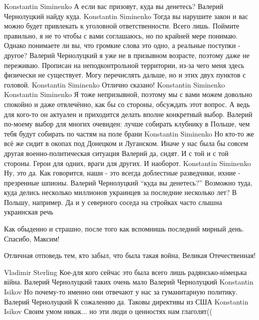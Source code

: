\begin{itemize}
\begin{itemize}
Konstantin Siminenko А если вас призовут, куда вы денетесь?
Валерий Чернолуцкий найду куда.
Konstantin Siminenko Тогда вы нарушите закон и вас можно будет привлекать к уголовной ответственности. Всего лишь. Поймите правильно, я не то чтобы с вами соглашаюсь, но по крайней мере понимаю. Однако понимаете ли вы, что громкие слова это одно, а реальные поступки - другое?
Валерий Чернолуцкий я уже не в призывном возрасте, поэтому даже не переживаю. Прописан на неподконтрольной территории, из-за чего меня здесь физически не существует. Могу перечислять дальше, но и этих двух пунктов с головой.
Konstantin Siminenko Отлично сказано!
Konstantin Siminenko 👏👏👏
Konstantin Siminenko Я тоже непризывной, поэтому мы с вами можем довольно спокойно и даже отвлечённо, как бы со стороны, обсуждать этот вопрос. А ведь для кого-то он актуален и приходится делать вполне конкретный выбор.
Валерий по-моему выбор для многих очевиден: лучше собирать клубнику в Польше, чем тебя будут собирать по частям на поле брани
Konstantin Siminenko Но кто-то же всё же сидит в окопах под Донецком и Луганском. Иначе у нас была бы совсем другая военно-политическая ситуация
Валерий да, сидят. И с той и с той стороны. Герои для одних, враги для других. И наоборот.
Konstantin Siminenko Ну, это да. Как говорится, наши - это всегда доблестные разведчики, ихние - презренные шпионы.
Валерий Чернолуцкий \enquote{куда вы денетесь?} Возможно туда, куда делись несколько миллионов украинцев за последние несколько лет? В Польшу, например. Да и у северного соседа на стройках часто слышна украинская речь
\end{itemize}

Как обыденно и страшно, после того как вспомнишь последний мирный день. Спасибо, Максим!

Отличная отповедь тем, кто забыл, что была такая война, Великая Отечественная!

\begin{itemize}
Vladimir Sterling Кое-для кого сейчас это была всего лишь радянсько-німецька війна.
Валерий Чернолуцкий таких очень мало
Валерий Чернолуцкий
Konstantin Isikov Но почему-то именно они отвечают у нас за гуманитарную политику.
Валерий Чернолуцкий К сожалению да.
Таковы директивы из США
Konstantin Isikov Своим умом никак... но эти люди о ценностях нам глаголят((
\end{itemize}


\end{itemize}
